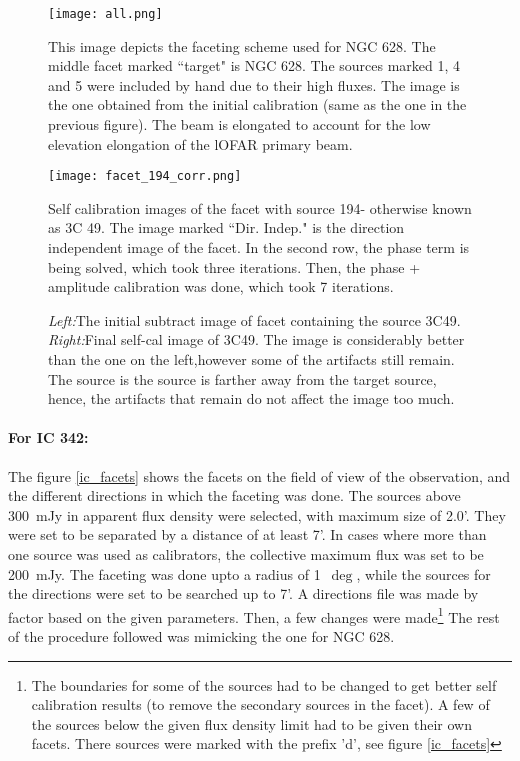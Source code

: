 \documentclass[../main/thesis_msc.tex]{subfiles}
\begin{document}
\begin{figure}[h]
\centering
\texttt{[image: all.png]}
\caption{This image depicts the faceting scheme used for NGC 628. The middle facet marked ``target" is NGC 628. The sources marked 1, 4 and 5 were included by hand due to their high fluxes. The image is the one obtained from the initial calibration (same as the one in the previous figure). The beam is elongated to account for the low elevation elongation of the lOFAR primary beam.}
\label{all}
\end{figure}


\begin{figure}[h]
\centering
\texttt{[image: facet\_194\_corr.png]}
\caption{Self calibration images of the facet with source 194- otherwise known as 3C 49. The image marked ``Dir. Indep." is the direction independent image of the facet. In the second row, the phase term is being solved, which took three iterations. Then, the phase + amplitude calibration was done, which took 7 iterations. }
\label{corr}
\end{figure}

\begin{figure}[h]
	\centering
	\caption{\textit{Left:}The initial subtract image of facet containing the source 3C49. \textit{Right:}Final self-cal image of 3C49. The image is considerably better than the one on the left,however some of the artifacts still remain. The source is the source is farther away from the target source, hence, the artifacts that remain do not affect the image too much.}
	\label{faceting}
	\end{figure}

\paragraph{For IC 342:} The figure \ref{ic_facets} shows the facets on the field of view of the observation, and the different directions in which the faceting was done. The sources above 300~mJy in apparent flux density were selected, with maximum size of 2.0'. They were set to be separated by a distance of at least 7'. In cases where more than one source was used as calibrators, the collective maximum flux was set to be 200~mJy. The faceting was done upto a radius of 1~$\deg$, while the sources for the directions were set to be searched up to 7'. A directions file was made by factor based on the given parameters. Then, a few changes were made\footnote{The boundaries for some of the sources had to be changed to get better self calibration results (to remove the secondary sources in the facet). A few of the sources below the given flux density limit had to be given their own facets. There sources were marked with the prefix 'd', see figure \ref{ic_facets}} The rest of the procedure followed was mimicking the one for NGC 628.\\
\end{document}
